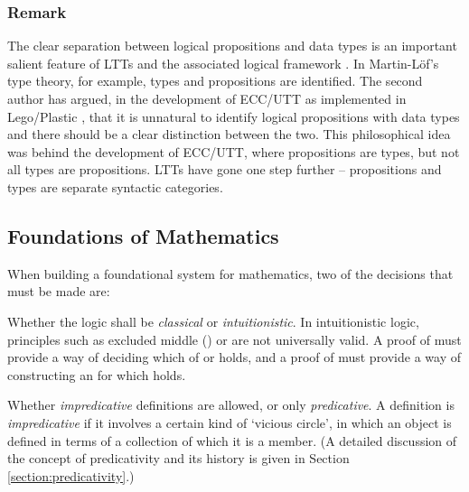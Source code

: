 \documentclass[acmtocl]{acmtrans2m}
\begin{document}
\subsubsection{Remark} The clear separation between logical
propositions and data types is an important salient feature of LTTs
\cite{ag:cpdtt,ga:gticst} and the associated logical framework
\cite{luo:LTT06}. In Martin-L\"{o}f's type theory, for example,
types and propositions are identified. The second author has argued,
in the development of ECC/UTT \cite{luo:car} as implemented in
Lego/Plastic \cite{legomanual:Report,plastic}, that it is unnatural
to identify logical propositions with data types and there should be
a clear distinction between the two. This philosophical idea was
behind the development of ECC/UTT, where propositions are types, but not all types are propositions.
LTTs have
gone one step further -- propositions and types are separate syntactic categories.


\subsection{Foundations of Mathematics}

When building a foundational system for mathematics, two of the decisions that must be made are:
\begin{longenum}
 \item Whether the logic shall be \emph{classical} or \emph{intuitionistic}.  In intuitionistic logic, principles such as excluded middle () or  are not universally valid.  A proof of  must provide a way of deciding which of  or  holds, and a proof of  must provide a way of constructing an  for which  holds.
\item Whether \emph{impredicative} definitions are allowed, or only \emph{predicative}.  A definition is \emph{impredicative} if it involves a certain kind of `vicious circle', in which an object is defined in terms of a collection of which it is a member.  (A detailed discussion of the concept of predicativity and its history is given in Section \ref{section:predicativity}.)
\end{longenum}
\end{document}
